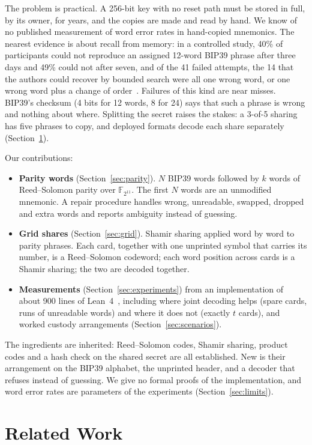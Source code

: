\documentclass[numeric]{anvil-paper}
\newcommand{\F}{\mathbb{F}}
\begin{document}
The problem is practical. A 256-bit key with no reset path must be stored in
full, by its owner, for years, and the copies are made and read by hand. We
know of no published measurement of word error rates in hand-copied mnemonics.
The nearest evidence is about recall from memory: in a controlled study, 40\%
of participants could not reproduce an assigned 12-word BIP39 phrase after
three days and 49\% could not after seven, and of the 41 failed attempts, the
14 that the authors could recover by bounded search were all one wrong word,
or one wrong word plus a change of order~\citep{ambati2026notall}. Failures of
this kind are near misses. BIP39's checksum (4 bits for 12 words, 8 for 24)
says that such a phrase is wrong and nothing about where. Splitting the secret
raises the stakes: a 3-of-5 sharing has five phrases to copy, and deployed
formats decode each share separately (Section~\ref{sec:related}).

Our contributions:
\begin{itemize}
\item \textbf{Parity words} (Section~\ref{sec:parity}). $N$ BIP39 words
  followed by $k$ words of Reed--Solomon parity over $\F_{2^{11}}$. The first
  $N$ words are an unmodified mnemonic. A repair procedure handles wrong,
  unreadable, swapped, dropped and extra words and reports ambiguity instead
  of guessing.
\item \textbf{Grid shares} (Section~\ref{sec:grid}). Shamir sharing applied word
  by word to parity phrases. Each card, together with one unprinted symbol
  that carries its number, is a Reed--Solomon codeword; each word position
  across cards is a Shamir sharing; the two are decoded together.
\item \textbf{Measurements} (Section~\ref{sec:experiments}) from an
  implementation of about 900 lines of Lean~4~\citep{moura2021lean}, including
  where joint decoding helps (spare cards, runs of unreadable words) and where
  it does not (exactly $t$ cards), and worked custody arrangements
  (Section~\ref{sec:scenarios}).
\end{itemize}
The ingredients are inherited: Reed--Solomon codes, Shamir sharing, product
codes and a hash check on the shared secret are all established. New is their
arrangement on the BIP39 alphabet, the unprinted header, and a decoder that
refuses instead of guessing. We give no formal proofs of the implementation,
and word error rates are parameters of the experiments
(Section~\ref{sec:limits}).

\section{Related Work}
\label{sec:related}
\end{document}
